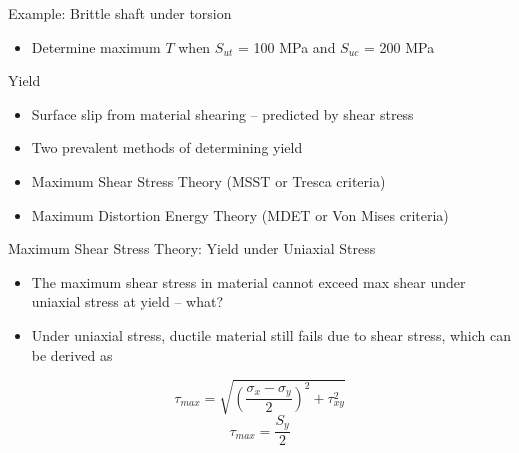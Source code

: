 \documentclass[10pt, svgnames]{beamer}
\begin{document}
\begin{frame}[label={sec:orgeb5f7d4}]{Example: Brittle shaft under torsion}

\begin{itemize}
\item Determine maximum \(T\) when \(S_{ut}\) = 100 MPa and \(S_{uc}\) = 200 MPa
\end{itemize}
\end{frame}


\begin{frame}[label={sec:orgdd1cc53}]{Yield}
\begin{itemize}
\item Surface slip from material shearing -- predicted by shear stress
\item Two prevalent methods of determining yield
\item Maximum Shear Stress Theory (MSST or Tresca criteria)
\item Maximum Distortion Energy Theory (MDET or Von Mises criteria)
\end{itemize}
\end{frame}

\begin{frame}[label={sec:orgde63e6a}]{Maximum Shear Stress Theory: Yield under Uniaxial Stress}
\begin{itemize}
\item The maximum shear stress in material cannot exceed max shear under uniaxial stress at yield -- what?
\item Under uniaxial stress, ductile material still fails due to shear stress, which can be derived as
\end{itemize}

$$\tau_{max} = \sqrt{\left(\frac{\sigma_x-\sigma_y}{2}\right)^2+\tau_{xy}^2}$$
$$\tau_{max} = \frac{S_y}{2}$$
\end{frame}
\end{document}

